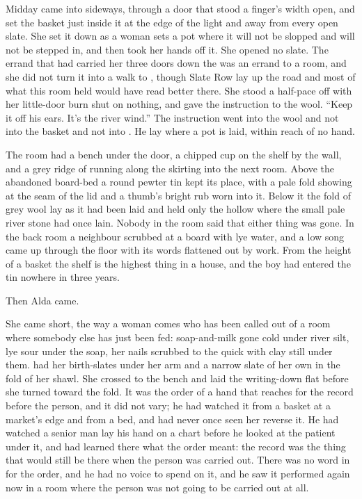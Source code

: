 Midday came into  sideways, through a door that stood a finger's width open, and  set the basket just inside it at the edge of the light and away from every open slate. She set it down as a woman sets a pot where it will not be slopped and will not be stepped in, and then took her hands off it. She opened no slate. The errand that had carried her three doors down the  was an errand to a room, and she did not turn it into a walk to , though Slate Row lay up the road and most of what this room held would have read better there. She stood a half-pace off with her little-door burn shut on nothing, and gave the instruction to the wool. “Keep it off his ears. It's the river wind.” The instruction went into the wool and not into the basket and not into . He lay where a pot is laid, within reach of no hand.

The room had a bench under the door, a chipped cup on the shelf by the wall, and a grey ridge of  running along the skirting into the next room. Above the abandoned board-bed a round pewter tin kept its place, with a pale fold showing at the seam of the lid and a thumb's bright rub worn into it. Below it the fold of grey wool lay as it had been laid and held only the hollow where the small pale river stone had once lain. Nobody in the room said that either thing was gone. In the back room a neighbour scrubbed at a board with lye water, and a low song came up through the floor with its words flattened out by work. From the height of a basket the shelf is the highest thing in a house, and the boy had entered the tin nowhere in three years.

Then Alda came.

She came short, the way a woman comes who has been called out of a room where somebody else has just been fed: soap-and-milk gone cold under river silt, lye sour under the soap, her nails scrubbed to the quick with clay still under them.  had her birth-slates under her arm and a narrow slate of her own in the fold of her shawl. She crossed to the bench and laid the writing-down flat before she turned toward the fold. It was the order of a hand that reaches for the record before the person, and it did not vary; he had watched it from a basket at a market's edge and from a bed, and had never once seen her reverse it. He had watched a senior man lay his hand on a chart before he looked at the patient under it, and had learned there what the order meant: the record was the thing that would still be there when the person was carried out. There was no word in  for the order, and he had no voice to spend on it, and he saw it performed again now in a room where the person was not going to be carried out at all.

